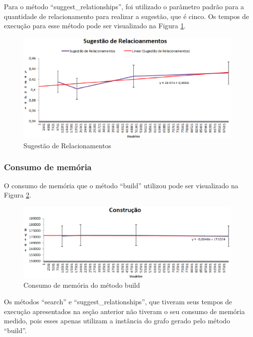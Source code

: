 Para o método ``suggest\_relationships'', foi utilizado o parâmetro padrão para a quantidade de relacionamento para realizar a sugestão, que é cinco. Os tempos de execução para esse método pode ser visualizado na Figura \ref{suggest}.

\begin{figure}[!h]
	\centering
	\includegraphics[scale=0.8]{figuras/capitulo7/graficos/network/tempo/sugerir.eps}
	\caption[Sugestão de Relacionamentos]{Sugestão de Relacionamentos}
	\label{suggest}
\end{figure}

\subsubsection{Consumo de memória}

O consumo de memória que o método ``build'' utilizou pode ser visualizado na Figura \ref{build_memoria}.

\begin{figure}[!h]
	\centering
	\includegraphics[scale=0.8]{figuras/capitulo7/graficos/network/memoria/build_memoria.eps}
	\caption[Consumo de memória do método build]{Consumo de memória do método build}
	\label{build_memoria}
\end{figure}

Os métodos ``search'' e ``suggest\_relationships'', que tiveram seus tempos de execução apresentados na seção anterior não tiveram o seu consumo de memória medido, pois esses apenas utilizam a instância do grafo gerado pelo método ``build''.

